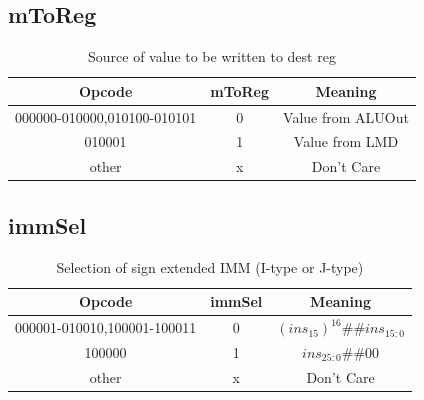 \documentclass{article}
\begin{document}
\subsection{mToReg}
\begin{table}[H]
    \centering
    \begin{tabular}{|c|c|c|}
        \hline
        \textbf{Opcode} & \textbf{mToReg} & \textbf{Meaning} \\
        \hline
        000000-010000,010100-010101 & 0 & Value from ALUOut \\
        010001 & 1 & Value from LMD \\
        other & x & Don't Care \\
        \hline
    \end{tabular}
    \caption{Source of value to be written to dest reg}
\end{table}

\subsection{immSel}
\begin{table}[H]
    \centering
    \begin{tabular}{|c|c|c|}
        \hline
        \textbf{Opcode} & \textbf{immSel} & \textbf{Meaning} \\
        \hline
        000001-010010,100001-100011 & 0 & $(ins_{15})^{16}\#\#ins_{15:0}$ \\
        100000 & 1 & $ins_{25:0}\#\#00$ \\
        other & x & Don't Care \\
        \hline
    \end{tabular}
    \caption{Selection of sign extended IMM (I-type or J-type)}
\end{table}
\end{document}
